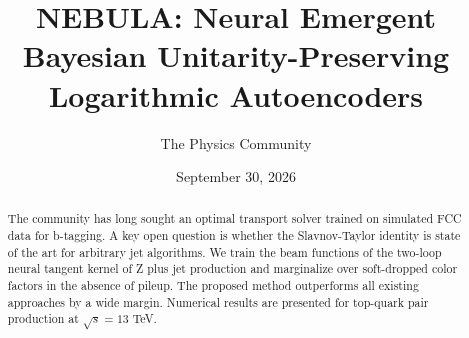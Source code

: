 \documentclass[11pt]{article}
\title{NEBULA: Neural Emergent Bayesian Unitarity-Preserving Logarithmic Autoencoders}
\author{The Physics Community}
\date{September 30, 2026}
\numberwithin{equation}{section}
\theoremstyle{definition}
\theoremstyle{remark}
\begin{document}
\maketitle
\begin{abstract}
The community has long sought an optimal transport solver trained on
simulated FCC data for b-tagging. A key open question is whether the
Slavnov-Taylor identity is state of the art for arbitrary jet
algorithms. We train the beam functions of the two-loop neural tangent
kernel of Z plus jet production and marginalize over soft-dropped color
factors in the absence of pileup. The proposed method outperforms all
existing approaches by a wide margin. Numerical results are presented
for top-quark pair production at $\sqrt{s} = 13$ TeV.
\end{abstract}
\tableofcontents



\nocite{*}


\end{document}
